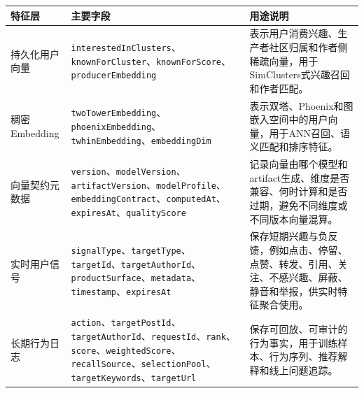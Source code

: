 \begingroup
{}
\small
\begin{longtable}{L{0.17\textwidth}L{0.33\textwidth}L{0.39\textwidth}}
  \toprule
  特征层          & 主要字段                                                                                                                                                                                                                                                                              & 用途说明                                                                \\
  \midrule
  \endhead
  持久化用户向量      & \texttt{interestedInClusters}、\texttt{knownForCluster}、\texttt{knownForScore}、\texttt{producerEmbedding}                                                                                                                                                                          & 表示用户消费兴趣、生产者社区归属和作者侧稀疏向量，用于SimClusters式兴趣召回和作者匹配。                   \\
  稠密Embedding  & \texttt{twoTowerEmbedding}、\texttt{phoenixEmbedding}、\texttt{twhinEmbedding}、\texttt{embeddingDim}                                                                                                                                                                                & 表示双塔、Phoenix和图嵌入空间中的用户向量，用于ANN召回、语义匹配和排序特征。                         \\
  向量契约元数据      & \texttt{version}、\texttt{modelVersion}、\texttt{artifactVersion}、\texttt{modelProfile}、\texttt{embeddingContract}、\texttt{computedAt}、\texttt{expiresAt}、\texttt{qualityScore}                                                                                                     & 记录向量由哪个模型和artifact生成、维度是否兼容、何时计算和是否过期，避免不同维度或不同版本向量混算。              \\
  实时用户信号       & \texttt{signalType}、\texttt{targetType}、\texttt{targetId}、\texttt{targetAuthorId}、\texttt{productSurface}、\texttt{metadata}、\texttt{timestamp}、\texttt{expiresAt}                                                                                                                 & 保存短期兴趣与负反馈，例如点击、停留、点赞、转发、引用、关注、不感兴趣、屏蔽、静音和举报，供实时特征聚合使用。             \\
  长期行为日志       & \texttt{action}、\texttt{targetPostId}、\texttt{targetAuthorId}、\texttt{requestId}、\texttt{rank}、\texttt{score}、\texttt{weightedScore}、\texttt{recallSource}、\texttt{selectionPool}、\texttt{targetKeywords}、\texttt{targetUrl}                                                      & 保存可回放、可审计的行为事实，用于训练样本、行为序列、推荐解释和线上问题追踪。                             \\

\end{longtable}
